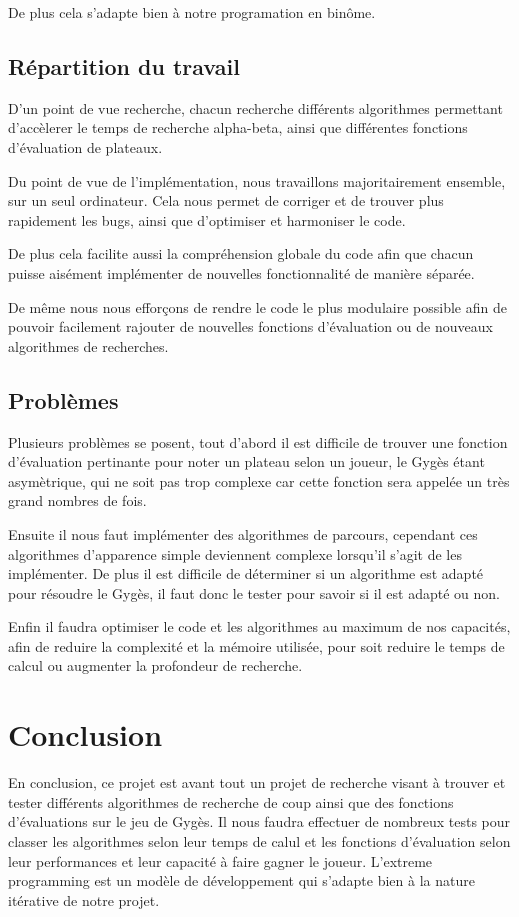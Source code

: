 \documentclass[a4paper]{article}
\begin{document}
		\vspace{1em}
		De plus cela s'adapte bien à notre programation en binôme.

	\subsection{Répartition du travail}
		D'un point de vue recherche, chacun recherche différents algorithmes permettant d'accèlerer le temps
		de recherche alpha-beta, ainsi que différentes fonctions d'évaluation de plateaux.


		Du point de vue de l'implémentation, nous travaillons majoritairement ensemble, sur un seul ordinateur.
		Cela nous permet de corriger et de trouver plus rapidement les bugs, ainsi que d'optimiser et harmoniser
		le code.


		De plus cela facilite aussi la compréhension globale du code afin que chacun puisse aisément implémenter
		de nouvelles fonctionnalité	de manière séparée.


		De même nous nous efforçons de rendre le code le plus modulaire possible afin de pouvoir facilement rajouter
		de nouvelles fonctions d'évaluation ou de nouveaux algorithmes de recherches.

	\subsection{Problèmes}
		Plusieurs problèmes se posent, tout d'abord il est difficile de trouver une fonction d'évaluation pertinante
		pour noter un plateau selon un joueur, le Gygès étant asymètrique, qui ne soit pas trop complexe car cette
		fonction sera appelée un très grand nombres de fois.


		Ensuite il nous faut implémenter des algorithmes de parcours, cependant ces algorithmes d'apparence simple deviennent
		complexe lorsqu'il s'agit de les implémenter. De plus il est difficile de déterminer si un algorithme est adapté
		pour résoudre le Gygès, il faut donc le tester pour savoir si il est adapté ou non.


		Enfin il faudra optimiser le code et les algorithmes au maximum de nos capacités, afin de reduire la complexité et la mémoire
		utilisée, pour soit reduire le temps de calcul ou augmenter la profondeur de recherche.

\section{Conclusion}
	En conclusion, ce projet est avant tout un projet de recherche visant à trouver et tester différents algorithmes de recherche
	de coup ainsi que des fonctions d'évaluations sur le jeu de Gygès. Il nous faudra effectuer de nombreux tests pour classer
	les algorithmes selon leur temps de calul et les fonctions d'évaluation selon leur performances et leur capacité à faire gagner le joueur.
	L'extreme programming est un modèle de développement qui s'adapte bien à la nature itérative de notre projet.
\end{document}
